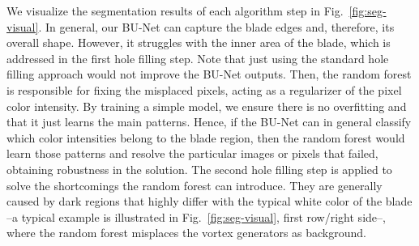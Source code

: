We visualize the segmentation results of each algorithm step in Fig.~\ref{fig:seg-visual}. In general, our BU-Net can capture the blade edges and, therefore, its overall shape. However, it struggles with the inner area of the blade, which is addressed in the first hole filling step. Note that just using the standard hole filling approach would not improve the BU-Net outputs. Then, the random forest is responsible for fixing the misplaced pixels, acting as a regularizer of the pixel color intensity. By training a simple model, we ensure there is no overfitting and that it just learns the main patterns. Hence, if the BU-Net can in general classify which color intensities belong to the blade region, then the random forest would learn those patterns and resolve the particular images or pixels that failed, obtaining robustness in the solution. The second hole filling step is applied to solve the shortcomings the random forest can introduce. They are generally caused by dark regions that highly differ with the typical white color of the blade --a typical example is illustrated in Fig.~\ref{fig:seg-visual}, first row/right side--, where the random forest misplaces the vortex generators as background.


